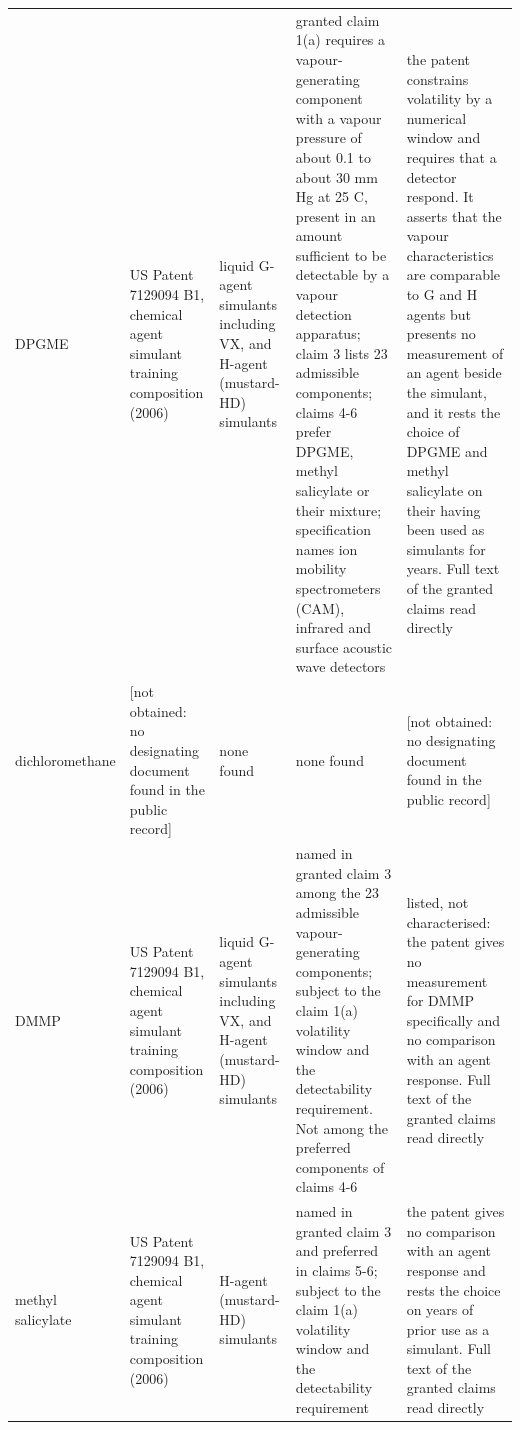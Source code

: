 \begin{table}[htb]
\begin{tabular}{p{1.9cm}p{3.4cm}p{1.5cm}p{2.3cm}p{4.2cm}}
DPGME & US Patent 7129094 B1, chemical agent simulant training composition (2006) & liquid G-agent simulants including VX, and H-agent (mustard-HD) simulants & granted claim 1(a) requires a vapour-generating component with a vapour pressure of about 0.1 to about 30 mm Hg at 25 C, present in an amount sufficient to be detectable by a vapour detection apparatus; claim 3 lists 23 admissible components; claims 4-6 prefer DPGME, methyl salicylate or their mixture; specification names ion mobility spectrometers (CAM), infrared and surface acoustic wave detectors & the patent constrains volatility by a numerical window and requires that a detector respond. It asserts that the vapour characteristics are comparable to G and H agents but presents no measurement of an agent beside the simulant, and it rests the choice of DPGME and methyl salicylate on their having been used as simulants for years. Full text of the granted claims read directly \\
dichloromethane & [not obtained: no designating document found in the public record] & none found & none found & [not obtained: no designating document found in the public record] \\
DMMP & US Patent 7129094 B1, chemical agent simulant training composition (2006) & liquid G-agent simulants including VX, and H-agent (mustard-HD) simulants & named in granted claim 3 among the 23 admissible vapour-generating components; subject to the claim 1(a) volatility window and the detectability requirement. Not among the preferred components of claims 4-6 & listed, not characterised: the patent gives no measurement for DMMP specifically and no comparison with an agent response. Full text of the granted claims read directly \\
methyl salicylate & US Patent 7129094 B1, chemical agent simulant training composition (2006) & H-agent (mustard-HD) simulants & named in granted claim 3 and preferred in claims 5-6; subject to the claim 1(a) volatility window and the detectability requirement & the patent gives no comparison with an agent response and rests the choice on years of prior use as a simulant. Full text of the granted claims read directly \\
\hline
\end{tabular}
\end{table}
